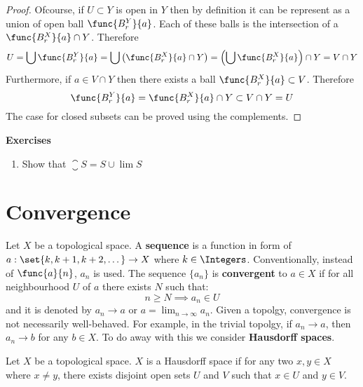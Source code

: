 \begin{proof}
    Ofcourse, if \(U \subset Y\) is open in \(Y\) then by definition it can be represent as a union of open ball \(\func{B_r^Y}{a} \). Each of these balls is the intersection of a \(\func{B_r^X}{a} \cap Y\). Therefore
    \begin{equation*}
        U = \bigcup \func{B_r^Y}{a} = \bigcup \left(\func{B_r^X}{a} \cap Y\right) = \left( \bigcup \func{B_r^X}{a} \right) \cap Y = V \cap Y
    \end{equation*}
    Furthermore, if \(a \in V \cap Y\) then there exists a ball \(\func{B_r^X}{a} \subset V\). Therefore
    \begin{equation*}
        \func{B_r^Y}{a} = \func{B_r^X}{a} \cap Y \subset V \cap Y = U
    \end{equation*}
    The case for closed subsets can be proved using the complements.
\end{proof}

{\Large\textbf{Exercises}}
\begin{enumerate}
    \item Show that \(\closure S = S \cup \lim S\)
\end{enumerate}
\newpage

\section{Convergence}
Let \(X\) be a topological space. A \textbf{sequence} is a function in form of \( a : \set{k, k+1, k+2, \dots } \to X\) where \(k \in \Integers \). Conventionally, instead of \(\func{a}{n}\), \(a_n\) is used. The sequence \(\{ a_n\}\) is \textbf{convergent} to \(a \in X\) if for all neighbourhood \(U\) of \(a\) there exists \(N\) such that:
\begin{equation*}
    n \geq N \implies a_n \in U
\end{equation*}
and it is denoted by \(a_n \to a\) or \(\displaystyle{a = \lim_{n \to \infty}{a_n}}\). Given a topolgy, convergence is not necessarily well-behaved. For example, in the trivial topolgy, if \(a_n \to a\), then \(a_n \to b\) for any \(b \in X\). To do away with this we consider \textbf{Hausdorff spaces}.

\begin{definition}
    Let \(X\) be a topological space. \(X\) is a Hausdorff space if for any two \(x,y \in X\) where \(x \neq y\), there exists disjoint open sets \(U\) and \(V\) such that \(x \in U\) and \(y \in V\).
\end{definition}


